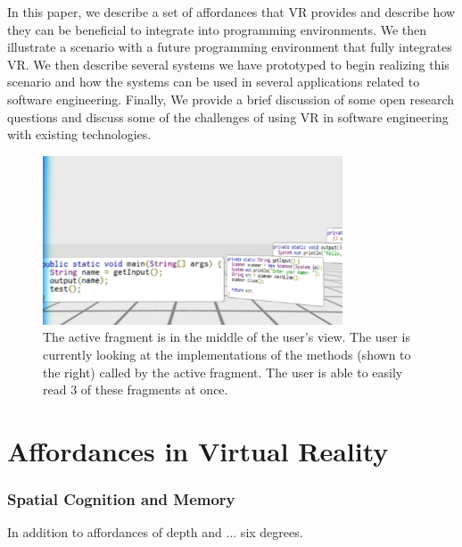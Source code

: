 \documentclass[conference]{IEEEtran}
\begin{document}
In this paper, we describe a set of affordances that VR provides and describe how they can be beneficial to integrate into programming environments.  
We then illustrate a scenario with a future programming environment that fully integrates VR.  We then describe several systems we have prototyped to begin realizing this scenario and how the systems can be used in several applications related to software engineering.  Finally, We provide a brief discussion of some open research questions and discuss some of the challenges of using VR in software engineering with existing technologies.

\begin{figure}[ht]
\centering
\includegraphics[width=\textwidth,height=5cm]{figures/unwarpped_stack}
\caption{The active fragment is in the middle of the user's view. The user is currently looking at the implementations of the methods (shown to the right) called by the active fragment. The user is able to easily read 3 of these fragments at once.  \label{immersion}}
\end{figure}


\section{Affordances in Virtual Reality}

\subsubsection{Spatial Cognition and Memory}

In addition to affordances of depth and ... six degrees.
\end{document}
